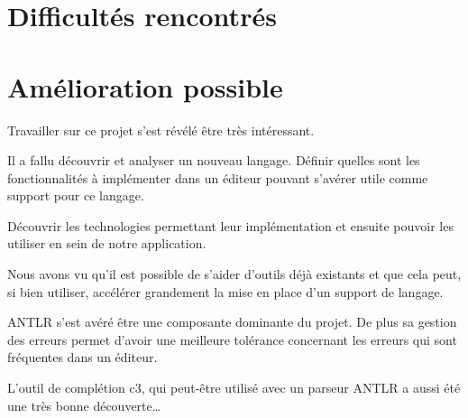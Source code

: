 \documentclass[
    iict, %
    il, %
]{heig-tb}
\begin{document}
\section{Difficultés rencontrés}

\section{Amélioration possible}





Travailler sur ce projet s'est révélé être très intéressant.


Il a fallu découvrir et analyser un nouveau langage.
Définir quelles sont les fonctionnalités à implémenter dans un éditeur pouvant s'avérer utile comme support pour ce langage.

Découvrir les technologies permettant leur implémentation et ensuite pouvoir les utiliser en sein de notre application. %



Nous avons vu qu'il est possible de s'aider d'outils déjà existants et que cela peut, si bien utiliser, accélérer grandement la mise en place d'un support de langage.

ANTLR s'est avéré être une composante dominante du projet. De plus sa gestion des erreurs permet d'avoir une meilleure tolérance concernant les erreurs
qui sont fréquentes dans un éditeur.

L'outil de complétion c3, qui peut-être utilisé avec un parseur ANTLR a aussi été une très bonne découverte\dots

\end{document}
